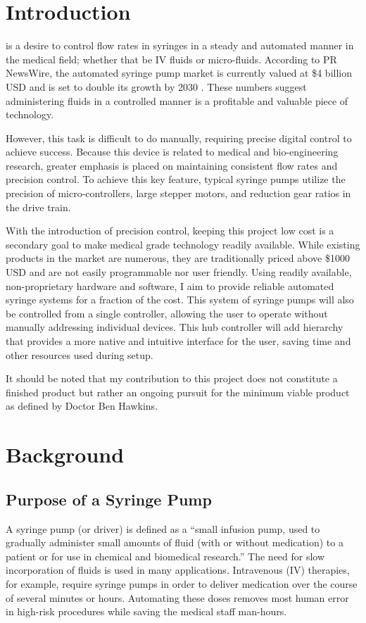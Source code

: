 \documentclass[journal]{IEEEtran}
\begin{document}
\section{Introduction}
     is a desire to control flow rates in syringes in a steady and automated manner in the medical field; whether that be IV fluids or micro-fluids. According to PR NewsWire, the automated syringe pump market is currently valued at \$4 billion USD and is set to double its growth by 2030 \cite{cision}. These numbers suggest administering fluids in a controlled manner is a profitable and valuable piece of technology.
    
    However, this task is difficult to do manually, requiring precise digital control to achieve success. Because this device is related to medical and bio-engineering research, greater emphasis is placed on maintaining consistent flow rates and precision control. To achieve this key feature, typical syringe pumps utilize the precision of micro-controllers, large stepper motors, and reduction gear ratios in the drive train.
    
    With the introduction of precision control, keeping this project low cost is a secondary goal to make medical grade technology readily available. While existing products in the market are numerous, they are traditionally priced above \$1000 USD and are not easily programmable nor user friendly. Using readily available, non-proprietary hardware and software, I aim to provide reliable automated syringe systems for a fraction of the cost. This system of syringe pumps will also be controlled from a single controller, allowing the user to operate without manually addressing individual devices. This hub controller will add hierarchy that provides a more native and intuitive interface for the user, saving time and other resources used during setup.
    
    It should be noted that my contribution to this project does not constitute a finished product but rather an ongoing pursuit for the minimum viable product as defined by Doctor Ben Hawkins.

\section{Background}

    \subsection{Purpose of a Syringe Pump}
        A syringe pump (or driver) is defined as a “small infusion pump, used to gradually
        administer small amounts of fluid (with or without medication) to a patient or for use in chemical and biomedical research.” \cite{wiki-pump} The need for slow incorporation of fluids is used in many applications. Intravenous (IV) therapies, for example, require syringe pumps in order to deliver medication over the course of several minutes or hours. Automating these doses removes most human error in high-risk procedures while saving the medical staff man-hours.
        
\end{document}
